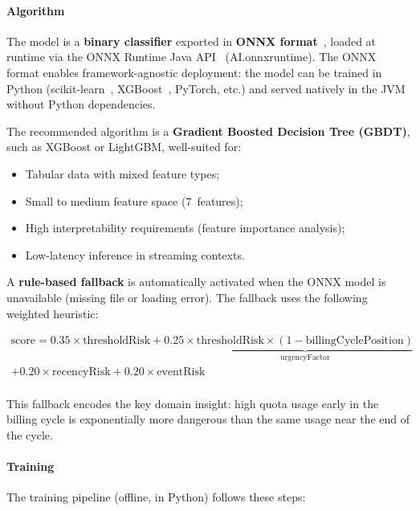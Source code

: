 \paragraph{Algorithm}

The model is a \textbf{binary classifier} exported in \textbf{ONNX format}~\cite{onnx},
loaded at runtime via the ONNX Runtime Java API~\cite{onnxruntime} (AI.onnxruntime).
The ONNX format enables framework-agnostic deployment: the model can be trained in Python (scikit-learn~\cite{sklearn}, XGBoost~\cite{xgboost}, PyTorch, etc.)
and served natively in the JVM without Python dependencies.

The recommended algorithm is a \textbf{Gradient Boosted Decision Tree (GBDT)}, such as XGBoost or LightGBM,
well-suited for:
\begin{itemize}
    \item[-] Tabular data with mixed feature types;
    \item[-] Small to medium feature space (7~features);
    \item[-] High interpretability requirements (feature importance analysis);
    \item[-] Low-latency inference in streaming contexts.
\end{itemize}

A \textbf{rule-based fallback} is automatically activated when the ONNX model is unavailable (missing file or loading error).
The fallback uses the following weighted heuristic:

\begin{multline}
    \text{score} = 0.35 \times \text{thresholdRisk}
    + 0.25 \times \underbrace{\text{thresholdRisk} \times (1 - \text{billingCyclePosition})}_{\text{urgencyFactor}} \\
    + 0.20 \times \text{recencyRisk}
    + 0.20 \times \text{eventRisk} \\
\end{multline}

This fallback encodes the key domain insight: high quota usage early in the billing cycle is
exponentially more dangerous than the same usage near the end of the cycle.

\paragraph{Training}

The training pipeline (offline, in Python) follows these steps:

